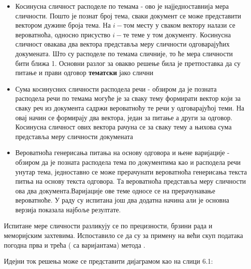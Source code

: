 \begin{itemize}
\item Косинусна сличност расподеле по темама - ово је најједноставнија мера сличности. Пошто је познат број тема, сваки документ се може представити вектором дужине броја тема. На $i-том$ месту у сваком вектору налази се вероватноћа, односно присуство $i-те$ теме у том документу. Косинусна сличност овакава два вектора представља меру сличности одговарајућих докумената. Што су расподеле по темама сличније, то ће мера сличности бити ближа 1. Основни разлог за овакво решење била је претпоставка да су питање и прави одговор \textbf{тематски} јако слични

\item Сума косинусних сличности расподела речи - обзиром да је позната расподела речи по темама могуће је  за сваку тему формирати вектор који за сваку реч из документа садржи вероватноћу те речи у одговарајућој теми. На овај начин се формирају два вектора, један за питање а други за одговор. Косинусна сличност ових вектора рачуна се за сваку тему а њихова сума представља меру сличности докумената

\item Вероватноћа генерисања питања на основу одговора и њене варијације - обзиром да је позната расподела тема по документима као и расподела речи унутар тема, једноставно се може прерачунати вероватноћа генерисања текста питња на основу текста одговора. Та вероватноћа представља меру сличности ова два документа.Варијације ове теме односе се на прерачунавање вероватноће. У раду су испитана још два додатна начина али је основна верзија показала најбоље резултате.

\end{itemize}

Испитане мере сличности разликују се по прецизности, брзини рада и меморијским захтевима. Испоставило се да су  за примену на већи скуп података погодна прва и трећа ( са варијантама) метода .

Идејни ток решења може се представити  дијаграмом као на слици 6.1:

